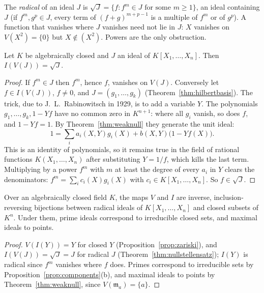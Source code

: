 The \emph{radical} of an ideal $J$ is $\sqrt J=\{f:f^m\in J\text{ for some }m\ge1\}$, an ideal containing $J$ (if $f^m,g^p\in J$, every term of $(f+g)^{m+p-1}$ is a multiple of $f^m$ or of $g^p$). A function that vanishes where $J$ vanishes need
not lie in $J$: $X$ vanishes on $V(X^2)=\{0\}$ but $X\notin(X^2)$. Powers are the only obstruction.

\begin{theorem}\label{thm:nullstellensatz}
Let $K$ be algebraically closed and $J$ an ideal of $K[X_1,\dots,X_n]$. Then $I(V(J))=\sqrt J$.
\end{theorem}

\begin{proof}
If $f^m\in J$ then $f^m$, hence $f$, vanishes on $V(J)$. Conversely let $f\in I(V(J))$, $f\ne0$, and $J=(g_1,\dots,g_k)$ (Theorem~\ref{thm:hilbertbasis}). The trick, due to J.~L.~Rabinowitsch in 1929, is to add a variable $Y$. The polynomials
$g_1,\dots,g_k,1-Yf$ have no common zero in $K^{n+1}$: where all $g_i$ vanish, so does $f$, and $1-Yf=1$. By Theorem~\ref{thm:weaknull} they generate the unit ideal:
\[1=\sum_ia_i(X,Y)g_i(X)+b(X,Y)\bigl(1-Yf(X)\bigr).\]
This is an identity of polynomials, so it remains true in the field of rational functions $K(X_1,\dots,X_n)$ after substituting $Y=1/f$, which kills the last term. Multiplying by a power $f^m$ with $m$ at least the degree of every
$a_i$ in $Y$ clears the denominators: $f^m=\sum_ic_i(X)g_i(X)$ with $c_i\in K[X_1,\dots,X_n]$. So $f\in\sqrt J$.
\end{proof}

\begin{corollary}\label{cor:dictionary}
Over an algebraically closed field $K$, the maps $V$ and $I$ are inverse, inclusion-reversing bijections between radical ideals of $K[X_1,\dots,X_n]$ and closed subsets of $K^n$. Under them, prime ideals correspond to
irreducible closed sets, and maximal ideals to points.
\end{corollary}

\begin{proof}
$V(I(Y))=Y$ for closed $Y$ (Proposition~\ref{prop:zariski}), and $I(V(J))=\sqrt J=J$ for radical $J$ (Theorem~\ref{thm:nullstellensatz}); $I(Y)$ is radical since $f^m$ vanishes where $f$ does. Primes correspond to irreducible sets by
Proposition~\ref{prop:components}(b), and maximal ideals to points by Theorem~\ref{thm:weaknull}, since $V(\mathfrak m_a)=\{a\}$.
\end{proof}

